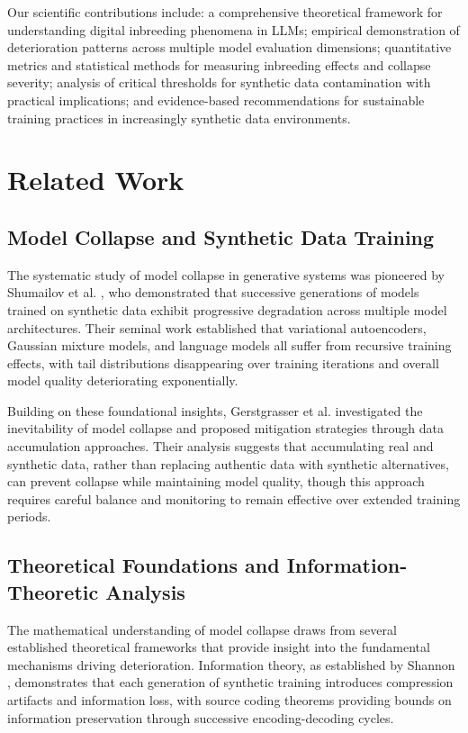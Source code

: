 \documentclass{article}
\begin{document}
Our scientific contributions include: a comprehensive theoretical framework for understanding digital inbreeding phenomena in LLMs; empirical demonstration of deterioration patterns across multiple model evaluation dimensions; quantitative metrics and statistical methods for measuring inbreeding effects and collapse severity; analysis of critical thresholds for synthetic data contamination with practical implications; and evidence-based recommendations for sustainable training practices in increasingly synthetic data environments.

\section{Related Work}

\subsection{Model Collapse and Synthetic Data Training}

The systematic study of model collapse in generative systems was pioneered by Shumailov et al. \cite{shumailov2023curse}, who demonstrated that successive generations of models trained on synthetic data exhibit progressive degradation across multiple model architectures. Their seminal work established that variational autoencoders, Gaussian mixture models, and language models all suffer from recursive training effects, with tail distributions disappearing over training iterations and overall model quality deteriorating exponentially.

Building on these foundational insights, Gerstgrasser et al. \cite{gerstgrasser2024model} investigated the inevitability of model collapse and proposed mitigation strategies through data accumulation approaches. Their analysis suggests that accumulating real and synthetic data, rather than replacing authentic data with synthetic alternatives, can prevent collapse while maintaining model quality, though this approach requires careful balance and monitoring to remain effective over extended training periods.

\subsection{Theoretical Foundations and Information-Theoretic Analysis}

The mathematical understanding of model collapse draws from several established theoretical frameworks that provide insight into the fundamental mechanisms driving deterioration. Information theory, as established by Shannon \cite{shannon1948mathematical}, demonstrates that each generation of synthetic training introduces compression artifacts and information loss, with source coding theorems providing bounds on information preservation through successive encoding-decoding cycles.
\end{document}
